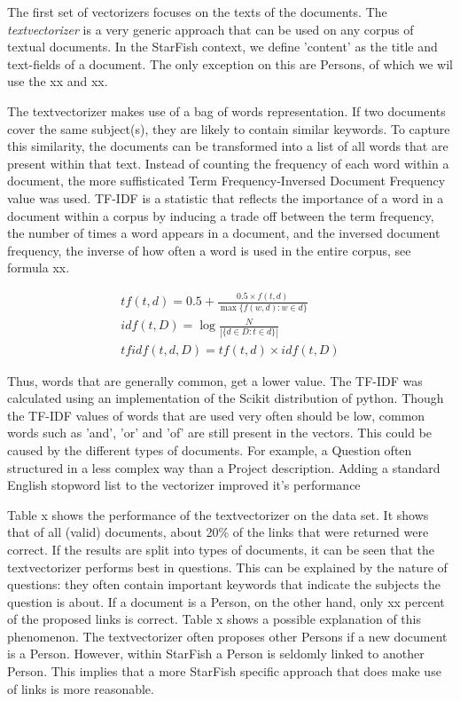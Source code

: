 The first set of vectorizers focuses on the texts of the documents. The \emph{textvectorizer} is a very generic approach that can be used on any corpus of textual documents. In the StarFish context, we define 'content' as the title and text-fields of a document. The only exception on this are Persons, of which we wil use the xx and xx. 

The textvectorizer makes use of a bag of words representation. If two documents cover the same subject(s), they are likely to contain similar keywords. To capture this similarity, the documents can be transformed into a list of all words that are present within that text. Instead of counting the frequency of each word within a document, the more suffisticated Term Frequency-Inversed Document Frequency value was used. TF-IDF is a statistic that reflects the importance of a word in a document within a corpus by inducing a trade off between the term frequency, the number of times a word appears in a document, and the inversed document frequency, the inverse of how often a word is used in the entire corpus, see formula xx. 

\begin{align}
\nonumber {tf}(t,d) = 0.5 + \frac{0.5 \times {f}(t, d)}{\max\{{f}(w, d):w \in d\}}\\
\nonumber {idf}(t, D) =  \log \frac{N}{|\{d \in D: t \in d\}|}\\
\nonumber {tfidf}(t,d,D) = {tf}(t,d) \times {idf}(t, D)
\end{align}

Thus, words that are generally common, get a lower value. The TF-IDF was calculated using an implementation of the Scikit distribution of python.  Though the TF-IDF values of words that are used very often should be low, common words such as 'and', 'or' and 'of' are still present in the vectors. This could be caused by the different types of documents. For example, a Question often structured in a less complex way than a Project description. Adding a standard English stopword list to the vectorizer improved it's performance %

Table x shows the performance of the textvectorizer on the data set. It shows that of all (valid) documents, about 20\% of the links that were returned were correct. If the results are split into types of documents, it can be seen that the textvectorizer performs best in questions. This can be explained by the nature of questions: they often contain important keywords that indicate the subjects the question is about. If a document is a Person, on the other hand, only xx percent of the proposed links is correct. Table x shows a possible explanation of this phenomenon. The textvectorizer often proposes other Persons if a new document is a Person. However, within StarFish a Person is seldomly linked to another Person. This implies that a more StarFish specific approach that does make use of links is more reasonable. 
